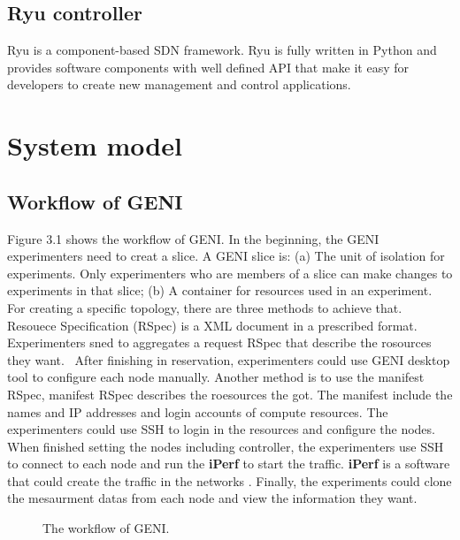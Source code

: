 \documentclass[a4paper,12pt]{report}
\begin{document}
\begin{large}
     \section{Ryu controller}
     \qquad Ryu is a component-based SDN framework. Ryu is fully written in Python and provides software components with well defined API that make it easy for developers to create new management and control applications. 
     \chapter{System model}
     \section{Workflow of GENI}
     \qquad Figure 3.1 shows the workflow of GENI. In the beginning, the GENI experimenters need to creat a slice. A GENI slice is: (a) The unit of isolation for experiments. Only experimenters who are members of a slice can make changes to experiments in that slice; (b) A container for resources used in an experiment.
     \newline
     \null\qquad For creating a specific topology, there are three methods to achieve that. Resouece Specification (RSpec) is a XML document in a prescribed format. Experimenters sned to  aggregates a request RSpec that describe the rosources they want.\
     \newline
     \null\qquad After finishing in reservation, experimenters could use GENI desktop tool to configure each node manually. Another method is to use the manifest RSpec, manifest RSpec describes the roesources the got. The manifest include the names and IP addresses and login accounts of compute resources. The experimenters could use SSH to login in the resources and configure the nodes.
     \newline
     \null\qquad When finished setting the nodes including controller, the experimenters use SSH to connect to each node and run the {\bf iPerf} to start the traffic. {\bf iPerf} is a software that could create the traffic in the networks \cite{iperf}.
     \newline
     \null\qquad Finally, the experiments could clone the mesaurment datas from each node and view the information they want.
       \begin{figure}
          \caption{The workflow of GENI.}
          \centering

\end{figure}
\end{large}
\end{document}
